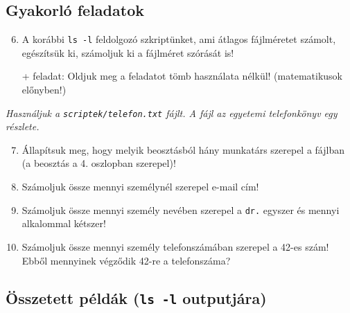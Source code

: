 \subsection*{Gyakorló feladatok}
\begin{enumerate}
\setcounter{enumi}{5}
\item A korábbi \texttt{ls -l} feldolgozó szkriptünket, ami átlagos fájlméretet számolt, egészítsük ki,
	számoljuk ki a fájlméret szórását is!

	+ feladat: Oldjuk meg a feladatot tömb használata nélkül! (matematikusok előnyben!)
\end{enumerate}

\noindent \emph{Használjuk a \texttt{scriptek/telefon.txt} fájlt. A fájl az egyetemi telefonkönyv egy részlete. }

\begin{enumerate}
\setcounter{enumi}{6}
\item Állapítsuk meg, hogy melyik beosztásból hány munkatárs szerepel a fájlban (a beosztás a 4. oszlopban szerepel)!
\item Számoljuk össze mennyi személynél szerepel e-mail cím!
\item Számoljuk össze mennyi személy nevében szerepel a \texttt{dr.} egyszer és mennyi alkalommal kétszer!
\item Számoljuk össze mennyi személy telefonszámában szerepel a 42-es szám!
	Ebből mennyinek végződik 42-re a telefonszáma?
\end{enumerate}


	\subsection[Összetett példák]{Összetett példák (\texttt{ls -l} outputjára)}
    
    
    

	
